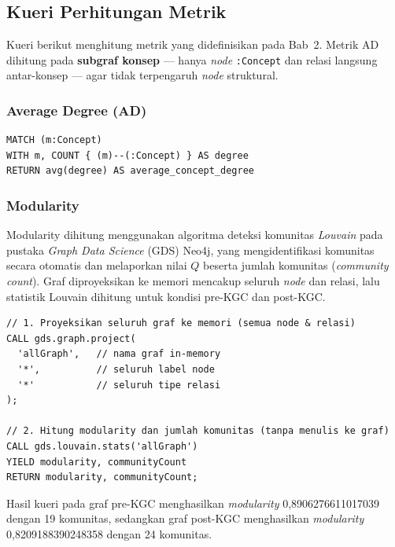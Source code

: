 \documentclass[../../thesis]{subfiles}
\begin{document}
\subsection{Kueri Perhitungan Metrik}
\label{lamp:cypher-metrik}

Kueri berikut menghitung metrik yang didefinisikan pada Bab~2. Metrik
AD dihitung pada \textbf{subgraf konsep} --- hanya \textit{node} \texttt{:Concept} dan relasi
langsung antar-konsep --- agar tidak terpengaruh \textit{node} struktural.

\subsubsection{Average Degree (AD)}

\begin{lstlisting}[style=cypherbox,caption={AD pada subgraf konsep.},label={lst:cypher-ad}]
MATCH (m:Concept)
WITH m, COUNT { (m)--(:Concept) } AS degree
RETURN avg(degree) AS average_concept_degree
\end{lstlisting}

\subsubsection{Modularity}

Modularity dihitung menggunakan algoritma deteksi komunitas \textit{Louvain}
pada pustaka \textit{Graph Data Science} (GDS) Neo4j, yang mengidentifikasi
komunitas secara otomatis dan melaporkan nilai $Q$ beserta jumlah komunitas
(\textit{community count}). Graf diproyeksikan ke memori mencakup seluruh
\textit{node} dan relasi, lalu statistik Louvain dihitung untuk kondisi pre-KGC
dan post-KGC.

\begin{lstlisting}[style=cypherbox,caption={Proyeksi graf dan perhitungan modularity via GDS Louvain.},label={lst:cypher-modularity}]
// 1. Proyeksikan seluruh graf ke memori (semua node & relasi)
CALL gds.graph.project(
  'allGraph',   // nama graf in-memory
  '*',          // seluruh label node
  '*'           // seluruh tipe relasi
);

// 2. Hitung modularity dan jumlah komunitas (tanpa menulis ke graf)
CALL gds.louvain.stats('allGraph')
YIELD modularity, communityCount
RETURN modularity, communityCount;
\end{lstlisting}

Hasil kueri pada graf pre-KGC menghasilkan \textit{modularity}
0{,}8906276611017039 dengan 19 komunitas, sedangkan graf post-KGC menghasilkan
\textit{modularity} 0{,}8209188390248358 dengan 24 komunitas.
\end{document}
